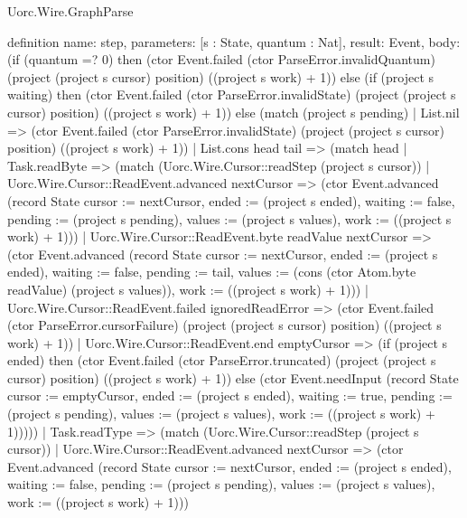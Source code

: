 \begin{lexlean}{Uorc.Wire.GraphParse}
\begin{semanticmodule}
definition{
  name: step,
  parameters: [s : State, quantum : Nat],
  result: Event,
  body: (if (quantum =? 0) then (ctor Event.failed (ctor ParseError.invalidQuantum) (project (project s cursor) position) ((project s work) + 1)) else (if (project s waiting) then (ctor Event.failed (ctor ParseError.invalidState) (project (project s cursor) position) ((project s work) + 1)) else (match (project s pending)
    | List.nil => (ctor Event.failed (ctor ParseError.invalidState) (project (project s cursor) position) ((project s work) + 1))
    | List.cons head tail => (match head
      | Task.readByte => (match (Uorc.Wire.Cursor::readStep (project s cursor))
        | Uorc.Wire.Cursor::ReadEvent.advanced nextCursor => (ctor Event.advanced (record State {cursor := nextCursor, ended := (project s ended), waiting := false, pending := (project s pending), values := (project s values), work := ((project s work) + 1)}))
        | Uorc.Wire.Cursor::ReadEvent.byte readValue nextCursor => (ctor Event.advanced (record State {cursor := nextCursor, ended := (project s ended), waiting := false, pending := tail, values := (cons (ctor Atom.byte readValue) (project s values)), work := ((project s work) + 1)}))
        | Uorc.Wire.Cursor::ReadEvent.failed ignoredReadError => (ctor Event.failed (ctor ParseError.cursorFailure) (project (project s cursor) position) ((project s work) + 1))
        | Uorc.Wire.Cursor::ReadEvent.end emptyCursor => (if (project s ended) then (ctor Event.failed (ctor ParseError.truncated) (project (project s cursor) position) ((project s work) + 1)) else (ctor Event.needInput (record State {cursor := emptyCursor, ended := (project s ended), waiting := true, pending := (project s pending), values := (project s values), work := ((project s work) + 1)}))))
      | Task.readType => (match (Uorc.Wire.Cursor::readStep (project s cursor))
        | Uorc.Wire.Cursor::ReadEvent.advanced nextCursor => (ctor Event.advanced (record State {cursor := nextCursor, ended := (project s ended), waiting := false, pending := (project s pending), values := (project s values), work := ((project s work) + 1)}))
}
\end{semanticmodule}
\end{lexlean}
